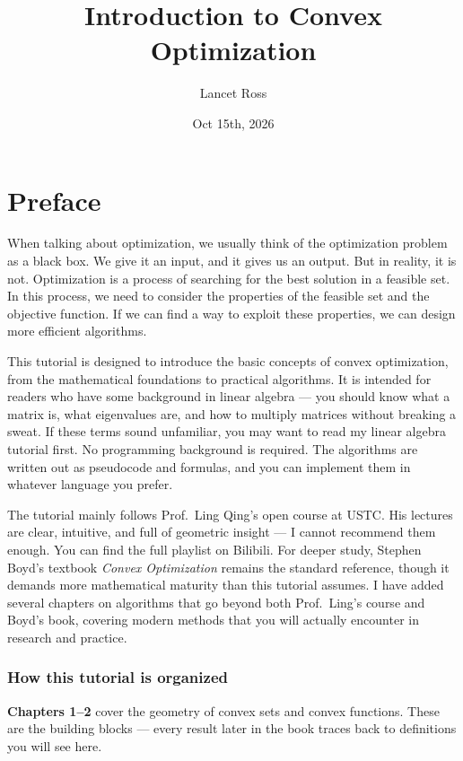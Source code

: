 \documentclass[lang=en,color=blue,mode=fancy,titlestyle=hang]{elegantbook}
\title{Introduction to Convex Optimization}
\author{Lancet Ross}
\date{Oct 15th, 2026}
\begin{document}
\maketitle

\frontmatter
\tableofcontents

\chapter*{Preface}

When talking about optimization, we usually think of the optimization problem as a black box.
We give it an input, and it gives us an output. But in reality, it is not. Optimization is a
process of searching for the best solution in a feasible set. In this process, we need to
consider the properties of the feasible set and the objective function. If we can find a way to
exploit these properties, we can design more efficient algorithms.

This tutorial is designed to introduce the basic concepts of convex optimization, from the
mathematical foundations to practical algorithms. It is intended for readers who have some
background in linear algebra — you should know what a matrix is, what eigenvalues are, and
how to multiply matrices without breaking a sweat. If these terms sound unfamiliar, you may
want to read my linear algebra tutorial first. No programming background is required. The
algorithms are written out as pseudocode and formulas, and you can implement them in
whatever language you prefer.

The tutorial mainly follows Prof.\ Ling Qing's open course at USTC. His lectures are clear,
intuitive, and full of geometric insight — I cannot recommend them enough. You can find the full
playlist on Bilibili. For deeper study, Stephen Boyd's textbook \textit{Convex Optimization}
remains the standard reference, though it demands more mathematical maturity than this tutorial
assumes. I have added several chapters on algorithms that go beyond both Prof.\ Ling's course
and Boyd's book, covering modern methods that you will actually encounter in research and practice.

\subsection*{How this tutorial is organized}

\textbf{Chapters 1–2} cover the geometry of convex sets and convex functions. These are the
building blocks — every result later in the book traces back to definitions you will see here.
\end{document}
